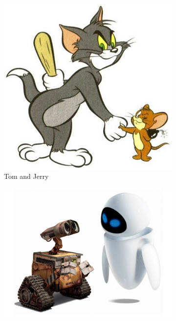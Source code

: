 \documentclass{report}
\begin{document}
\begin{landscape}
 
\begin{figure}
  \centering
  \begin{subfigure}[b]{0.5\textwidth}
    \includegraphics[width=\textwidth]{Pictures/TomandJerry.jpg}
    \caption{Tom and Jerry}
    \label{fig:TomJerry}   
  \end{subfigure}             
  \begin{subfigure}[b]{0.5\textwidth}
    \includegraphics[width=\textwidth]{Pictures/WallE.jpg}

\end{subfigure}
\end{figure}
\end{landscape}
\end{document}

